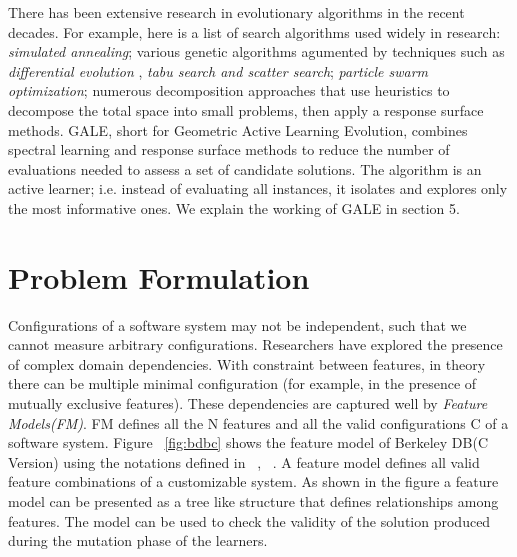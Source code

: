 \documentclass{sig-alternative}
\begin{document}
    There has been extensive research in evolutionary algorithms in the recent decades. For example, here is a list of search algorithms used widely in research: \textit{simulated annealing}\cite{bell2013limited, menzies2007business}; various genetic algorithms\cite{goldberg1979complexity} agumented by techniques such as \textit{differential evolution} \cite{storn1997differential}, \textit{tabu search and scatter search}\cite{nebro2008abyss, molina2007sspmo, glover1986general, beausoleil2006moss}; \textit{particle swarm optimization}\cite{pan2008particle}; numerous decomposition approaches that use heuristics to decompose the total space into small problems, then apply a response surface methods\cite{krall2014gale, zuluaga2013active}. GALE, short for Geometric Active Learning Evolution,
combines spectral learning and response surface methods
to reduce the number of evaluations needed to assess a set
of candidate solutions. The algorithm is an active learner;
i.e. instead of evaluating all instances, it isolates and explores
only the most informative ones. We explain the working of GALE in section 5.




\section{Problem Formulation}


    Configurations of a software system may not be independent, such that we cannot measure arbitrary configurations. Researchers have explored the presence of complex domain dependencies. With constraint between features, in theory there can be multiple minimal configuration (for example, in the presence of mutually exclusive features). These dependencies are captured well by \textit{Feature Models(FM)}. FM defines all the N features and all the valid configurations C of a software system. Figure ~\ref{fig:bdbc}  shows the feature model of Berkeley DB(C Version) using the notations defined in ~\cite{kang1990feature}, ~\cite{guo2012consistency}. A feature model defines all valid feature combinations of a customizable system. As shown in the figure a feature model can be presented as a tree like structure that defines relationships among features. The model can be used to check the validity of the solution produced during the mutation phase of the learners.
    
\end{document}
